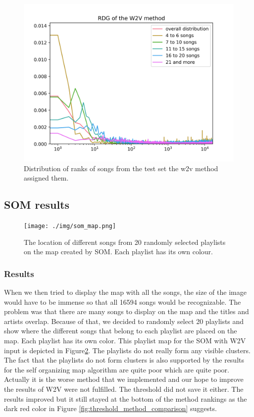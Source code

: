 \begin{figure}[h]
    \centering
	\includegraphics[width=120mm]{./img/w2v_graph.png}
	\caption{Distribution of ranks of songs from the test set the w2v method assigned them.}
	\label{fig:w2v_distribution}
\end{figure}

\subsection{SOM results}\label{ssec:som_results}

\begin{figure}[h]
    \centering
	\texttt{[image: ./img/som\_map.png]}
	\caption{The location of different songs from 20 randomly selected playlists on the map created by SOM. Each playlist has its own colour.}
	\label{fig:som_map}
\end{figure}

\subsubsection{Results}
When we then tried to display the map with all the songs, the size of the image would have to be immense so that all 16594 songs would be recognizable. The problem was that there are many songs to display on the map and the titles and artists overlap. Because of that, we decided to randomly select 20 playlists and show where the different songs that belong to each playlist are placed on the map. Each playlist has its own color. This playlist map for the SOM with W2V input is depicted in Figure\ref{fig:som_map}. The playlists do not really form any visible clusters. \\
The fact that the playlists do not form clusters is also supported by the results for the self organizing map algorithm are quite poor which are quite poor. Actually it is the worse method that we implemented and our hope to improve the results of W2V were not fulfilled. The threshold did not save it either. The results improved but it still stayed at the bottom of the method rankings as the dark red color in Figure \ref{fig:threshold_method_comparison} suggests.

